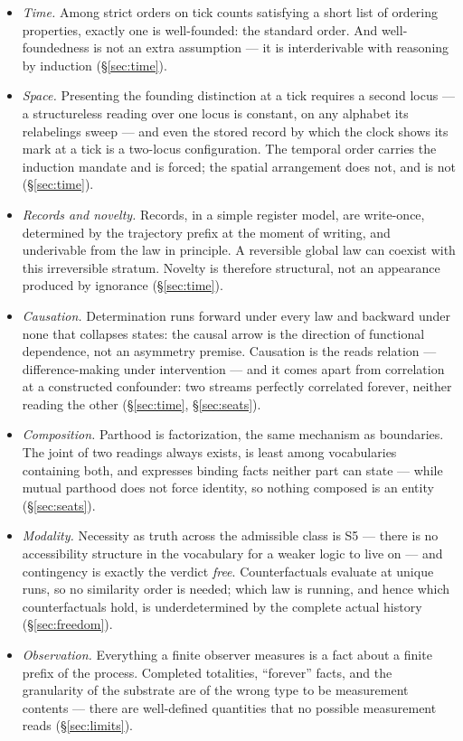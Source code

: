 \documentclass[11pt]{article}
\theoremstyle{remark}
\begin{document}
\begin{itemize}[leftmargin=1.6em, itemsep=2pt]
\item \emph{Time.} Among strict orders on tick counts satisfying a short list of ordering properties, exactly one is well-founded: the standard order. And well-foundedness is not an extra assumption --- it is interderivable with reasoning by induction (\S\ref{sec:time}).
\item \emph{Space.} Presenting the founding distinction at a tick requires a second locus --- a structureless reading over one locus is constant, on any alphabet its relabelings sweep --- and even the stored record by which the clock shows its mark at a tick is a two-locus configuration. The temporal order carries the induction mandate and is forced; the spatial arrangement does not, and is not (\S\ref{sec:time}).
\item \emph{Records and novelty.} Records, in a simple register model, are write-once, determined by the trajectory prefix at the moment of writing, and underivable from the law in principle. A reversible global law can coexist with this irreversible stratum. Novelty is therefore structural, not an appearance produced by ignorance (\S\ref{sec:time}).
\item \emph{Causation.} Determination runs forward under every law and backward under none that collapses states: the causal arrow is the direction of functional dependence, not an asymmetry premise. Causation is the reads relation --- difference-making under intervention --- and it comes apart from correlation at a constructed confounder: two streams perfectly correlated forever, neither reading the other (\S\ref{sec:time}, \S\ref{sec:seats}).
\item \emph{Composition.} Parthood is factorization, the same mechanism as boundaries. The joint of two readings always exists, is least among vocabularies containing both, and expresses binding facts neither part can state --- while mutual parthood does not force identity, so nothing composed is an entity (\S\ref{sec:seats}).
\item \emph{Modality.} Necessity as truth across the admissible class is S5 --- there is no accessibility structure in the vocabulary for a weaker logic to live on --- and contingency is exactly the verdict \emph{free}. Counterfactuals evaluate at unique runs, so no similarity order is needed; which law is running, and hence which counterfactuals hold, is underdetermined by the complete actual history (\S\ref{sec:freedom}).
\item \emph{Observation.} Everything a finite observer measures is a fact about a finite prefix of the process. Completed totalities, ``forever'' facts, and the granularity of the substrate are of the wrong type to be measurement contents --- there are well-defined quantities that no possible measurement reads (\S\ref{sec:limits}).

\end{itemize}
\end{document}
